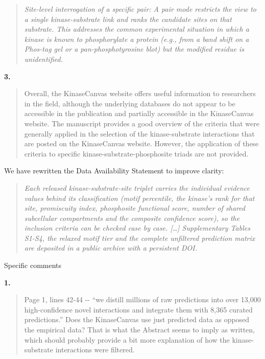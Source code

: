 \documentclass[
]{article}
\begin{document}
\begin{quote}
\emph{Site-level interrogation of a specific pair: A pair mode restricts
the view to a single kinase-substrate link and ranks the candidate sites
on that substrate. This addresses the common experimental situation in
which a kinase is known to phosphorylate a protein (e.g., from a band
shift on a Phos-tag gel or a pan-phosphotyrosine blot) but the modified
residue is unidentified.}
\end{quote}

\textbf{3.}

\begin{quote}
Overall, the KinaseCanvas website offers useful information to
researchers in the field, although the underlying databases do not
appear to be accessible in the publication and partially accessible in
the KinaseCanvas website. The manuscript provides a good overview of the
criteria that were generally applied in the selection of the
kinase-substrate interactions that are posted on the KinaseCanvas
website. However, the application of these criteria to specific
kinase-substrate-phosphosite triads are not provided.
\end{quote}

We have rewritten the Data Availability Statement to improve clarity:

\begin{quote}
\emph{Each released kinase-substrate-site triplet carries the individual
evidence values behind its classification (motif percentile, the
kinase's rank for that site, promiscuity index, phosphosite functional
score, number of shared subcellular compartments and the composite
confidence score), so the inclusion criteria can be checked case by
case. {[}\ldots{]} Supplementary Tables S1-S4, the relaxed motif tier
and the complete unfiltered prediction matrix are deposited in a public
archive with a persistent DOI.}
\end{quote}

Specific comments

\textbf{1.}

\begin{quote}
Page 1, lines 42-44 -\/- ``we distill millions of raw predictions into
over 13,000 high-confidence novel interactions and integrate them with
8,365 curated predictions.'' Does the KinaseCanvas use just predicted
data as opposed the empirical data? That is what the Abstract seems to
imply as written, which should probably provide a bit more explanation
of how the kinase-substrate interactions were filtered.
\end{quote}
\end{document}
